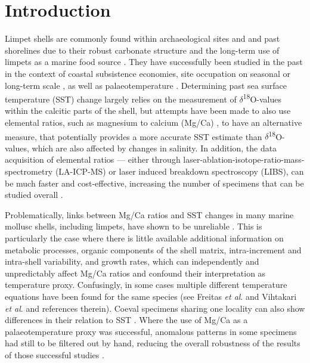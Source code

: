 \documentclass[
  authoryear,
  preprint,
  3p]{elsarticle}
\begin{document}
\section{Introduction}\label{Introduction}

Limpet shells are commonly found within archaeological sites and and
past shorelines due to their robust carbonate structure and the
long-term use of limpets as a marine food source \citep{Robson2023-oz}.
They have successfully been studied in the past in the context of
coastal subsistence economies, site occupation on seasonal
\citep{Shackleton1973-ij, Parker2018-wf, Bosch2018-ud} or long-term
scale \citep{Ortiz2015-mr}, as well as palaeotemperature
\citep{Fenger2007-gf, Surge2012-ba, Wang2012-ee, Colonese2012-ct, Ferguson2011-zl}.
Determining past sea surface temperature (SST) change largely relies on
the measurement of \(\delta\)\textsuperscript{18}O-values within the
calcitic parts of the shell, but attempts have been made to also use
elemental ratios, such as magnesium to calcium (Mg/Ca)
\citep{Graniero2017-io, Ferguson2011-zl}, to have an alternative
measure, that potentially provides a more accurate SST estimate than
\(\delta\)\textsuperscript{18}O-values, which are also affected by
changes in salinity. In addition, the data acquisition of elemental
ratios --- either through laser-ablation-isotope-ratio-mass-spectrometry
(LA-ICP-MS) or laser induced breakdown spectroscopy (LIBS), can be much
faster and cost-effective, increasing the number of specimens that can
be studied overall \citep{Durham2017-fh, Hausmann2023-ih}.

Problematically, links between Mg/Ca ratios and SST changes in many
marine mollusc shells, including limpets, have shown to be unreliable
\citep{Surge2008-ri, Wanamaker2008-zl, Schone2010-yl, Freitas2012-tx, Graniero2017-io, Poulain2015-dg, Vihtakari2017-wd}.
This is particularly the case where there is little available additional
information on metabolic processes, organic components of the shell
matrix, intra-increment and intra-shell variability, and growth rates,
which can independently and unpredictably affect Mg/Ca ratios and
confound their interpretation as temperature proxy. Confusingly, in some
cases multiple different temperature equations have been found for the
same species (see Freitas \emph{et al}. \citeyearpar{Freitas2012-tx} and
Vihtakari \emph{et al}. \citeyearpar{Vihtakari2017-wd} and references
therein). Coeval specimens sharing one locality can also show
differences in their relation to SST \citep{Hausmann2019-fi}. Where the
use of Mg/Ca as a palaeotemperature proxy was successful, anomalous
patterns in some specimens had still to be filtered out by hand,
reducing the overall robustness of the results of those successful
studies \citep{Ferguson2011-zl}.
\end{document}
